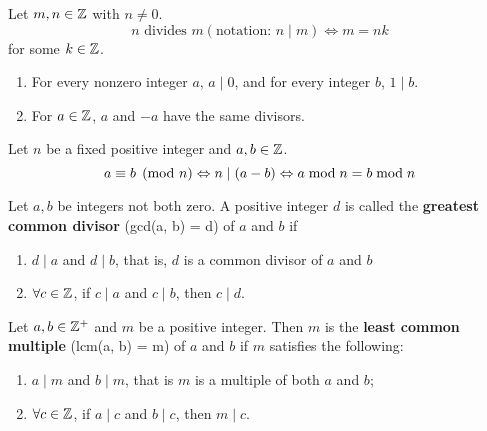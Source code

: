 \begin{definition}
    Let $m, n \in \mathbb{Z}$ with $n \neq 0$.
    \[ n \text{ divides } m (\text{notation: } n \mid  m) \Leftrightarrow m = nk \]
    for some $k \in \mathbb{Z}$.
\end{definition}

\begin{remark} \phantom{blank}
    \begin{enumerate}
        \item For every nonzero integer $a$, $a \mid 0$, and for every integer $b$, $1 \mid b$.
        \item For $a \in \mathbb{Z}$, $a$ and $-a$ have the same divisors.
    \end{enumerate}
\end{remark}

\begin{definition}
    Let $n$ be a fixed positive integer and $a, b \in \mathbb{Z}$.
    \[ a \equiv b \pmod{n} \Leftrightarrow n \mid \qty(a - b) \Leftrightarrow a \bmod{n} = b \bmod{n} \]
\end{definition}

\begin{definition}
    Let $a, b$ be integers not both zero. A positive integer $d$ is called the \textbf{greatest common divisor} (gcd(a, b) = d) of $a$ and $b$ if
    \vspace{1em}
    \begin{enumerate}
        \item $d \mid a$ and $d \mid b$, that is, $d$ is a common divisor of $a$ and $b$
        \item $\forall c \in \mathbb{Z}$, if $c \mid a$ and $c \mid b$, then $c \mid d$.
    \end{enumerate}
\end{definition}

\begin{definition}
    Let $a, b \in \mathbb{Z}^+$ and $m$ be a positive integer. Then $m$ is the \textbf{least common multiple} (lcm(a, b) = m) of $a$ and $b$ if $m$ satisfies the following:
    \vspace{1em}
    \begin{enumerate}
        \item $a \mid m$ and $b \mid m$, that is $m$ is a multiple of both $a$ and $b$;
        \item $\forall c \in \mathbb{Z}$, if $a \mid c$ and $b \mid c$, then $m \mid c$.
    \end{enumerate}
\end{definition}

